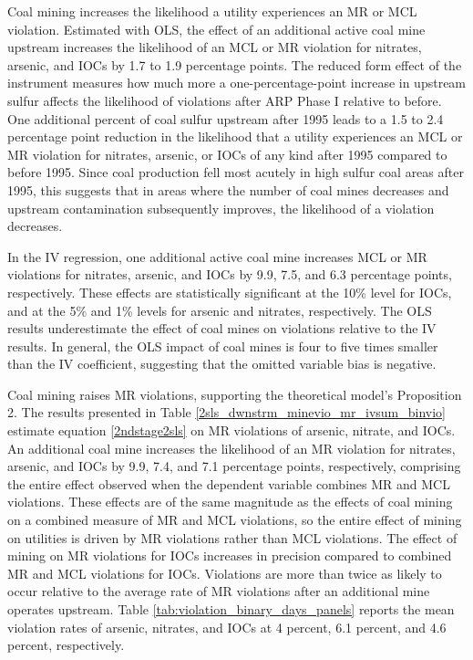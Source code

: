 \documentclass[12pt]{article}
\begin{document}
Coal mining increases the likelihood a utility experiences an MR or MCL violation. Estimated with OLS, the effect of an additional active coal mine upstream increases the likelihood of an MCL or MR violation for nitrates, arsenic, and IOCs by 1.7 to 1.9 percentage points. The reduced form effect of the instrument measures how much more a one-percentage-point increase in upstream sulfur affects the likelihood of violations after ARP Phase I relative to before. One additional percent of coal sulfur upstream after 1995 leads to a 1.5 to 2.4 percentage point reduction in the likelihood that a utility experiences an MCL or MR violation for nitrates, arsenic, or IOCs of any kind after 1995 compared to before 1995. Since coal production fell most acutely in high sulfur coal areas after 1995, this suggests that in areas where the number of coal mines decreases and upstream contamination subsequently improves, the likelihood of a violation decreases.

In the IV regression, one additional active coal mine increases MCL or MR violations for nitrates, arsenic, and IOCs by 9.9, 7.5, and 6.3 percentage points, respectively. These effects are statistically significant at the 10\% level for IOCs, and at the 5\% and 1\% levels for arsenic and nitrates, respectively. The OLS results underestimate the effect of coal mines on violations relative to the IV results. In general, the OLS impact of coal mines is four to five times smaller than the IV coefficient, suggesting that the omitted variable bias is negative.

Coal mining raises MR violations, supporting the theoretical model's Proposition 2. The results presented in Table \ref{2sls_dwnstrm_minevio_mr_ivsum_binvio} estimate equation \ref{2ndstage2sls} on MR violations of arsenic, nitrate, and IOCs. An additional coal mine increases the likelihood of an MR violation for nitrates, arsenic, and IOCs by 9.9, 7.4, and 7.1 percentage points, respectively, comprising the entire effect observed when the dependent variable combines MR and MCL violations. These effects are of the same magnitude as the effects of coal mining on a combined measure of MR and MCL violations, so the entire effect of mining on utilities is driven by MR violations rather than MCL violations. The effect of mining on MR violations for IOCs increases in precision compared to combined MR and MCL violations for IOCs. Violations are more than twice as likely to occur relative to the average rate of MR violations after an additional mine operates upstream. Table \ref{tab:violation_binary_days_panels} reports the mean violation rates of arsenic, nitrates, and IOCs at 4 percent, 6.1 percent, and 4.6 percent, respectively.
\end{document}
